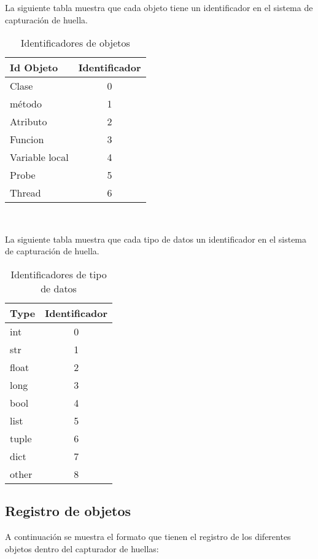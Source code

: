 \documentclass[10pt,a4paper]{article}
\begin{document}
La siguiente tabla muestra que cada objeto tiene un identificador en el sistema de capturación de huella.
\begin{table}[!h]
\begin{center}
\begin{tabular}{|l | c |}
\hline
Id Objeto & Identificador\\
\hline
Clase & 0\\
\hline
método & 1\\
\hline
Atributo & 2\\
\hline
Funcion & 3\\
\hline
Variable local & 4\\
\hline
Probe & 5\\
\hline
Thread & 6\\
\hline
\end{tabular}
\caption{Identificadores de objetos} 
\end{center}
\end{table}
\\
\pagebreak

La siguiente tabla muestra que cada tipo de datos un identificador en el sistema de capturación de huella.
\begin{table}[!h]
\begin{center}
\begin{tabular}{|l | c |}
\hline
Type & Identificador\\
\hline
int & 0\\
\hline
str & 1\\
\hline
float & 2\\
\hline
long & 3\\
\hline
bool & 4\\
\hline
list & 5\\
\hline
tuple & 6\\
\hline
dict & 7\\
\hline
other & 8\\
\hline
\end{tabular}
\caption{Identificadores de tipo de datos} 
\end{center}
\end{table}

\subsection{Registro de objetos}

A continuación se muestra el formato que tienen el registro de los diferentes objetos dentro del capturador de huellas:\\
\end{document}
